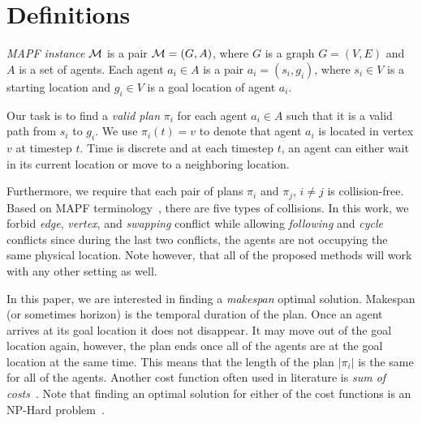 \section{Definitions}

\emph{MAPF instance} $\mathcal{M}$ is a pair $\mathcal{M} = (G,A)$, where $G$ is a graph $G = (V,E)$ and $A$ is a set of agents. Each agent $a_i \in A$ is a pair $a_i = (s_i,g_i)$, where $s_i \in V$ is a starting location and $g_i \in V$ is a goal location of agent $a_i$.

Our task is to find a \emph{valid plan} $\pi_i$ for each agent $a_i \in A$ such that it is a valid path from $s_i$ to $g_i$. We use $\pi_i(t) = v$ to denote that agent $a_i$ is located in vertex $v$ at timestep $t$. Time is discrete and at each timestep $t$, an agent can either wait in its current location or move to a neighboring location.

Furthermore, we require that each pair of plans $\pi_i$ and $\pi_j$, $i \neq j$ is collision-free. Based on MAPF terminology~\cite{stern2019mapfVarians}, there are five types of collisions. %
In this work, we forbid \emph{edge}, \emph{vertex}, and \emph{swapping} conflict while allowing \emph{following} and \emph{cycle} conflicts since during the last two conflicts, the agents are not occupying the same physical location. Note however, that all of the proposed methods will work with any other setting as well.%


In this paper, we are interested in finding a \emph{makespan} optimal solution. Makespan (or sometimes horizon) is the temporal duration of the plan. Once an agent arrives at its goal location it does not disappear. It may move out of the goal location again, however, the plan ends once all of the agents are at the goal location at the same time. This means that the length of the plan $|\pi_i|$ is the same for all of the agents. Another cost function often used in literature is \emph{sum of costs}~\cite{ICTS_soc}. Note that finding an optimal solution for either of the cost functions is an NP-Hard problem~\cite{NP-hard1,NP-hard2}.